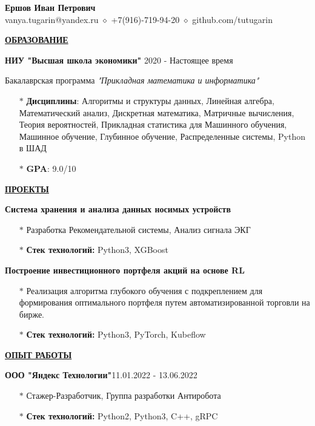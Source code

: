 \documentclass[11pt]{article}
\begin{document}
\begin{center}
\thispagestyle{empty}
\large \textbf{Ершов Иван Петрович \\}    
\normalsize vanya.tugarin@yandex.ru $\diamond$ +7(916)-719-94-20 $\diamond$ github.com/tutugarin   \\
\hrulefill
\end{center}

\noindent \textbf{\underline{ОБРАЗОВАНИЕ}} \\
\par \textbf{НИУ "Высшая школа экономики"} \hfill 2020 - Настоящее время
\par Бакалаврская программа \textit{"Прикладная математика и информатика" } 
\begin{itemize}
\item[$\ast$] \textbf{Дисциплины}: Алгоритмы и структуры данных, Линейная алгебра, Математический анализ, Дискретная математика, Матричные вычисления, Теория вероятностей, Прикладная статистика для Машинного обучения, Машинное обучение, Глубинное обучение, Распределенные системы, Python в ШАД

\item[$\ast$] \textbf{GPA}: 9.0/10 \\
\end{itemize}

\noindent \textbf{\underline{ПРОЕКТЫ}} \\
\par \textbf{\large{Система хранения и анализа данных носимых устройств}}
\begin{itemize}
\item[$\ast$] Разработка Рекомендательной системы, Анализ сигнала ЭКГ
\item[$\ast$] \textbf{Стек технологий:} Python3, XGBoost\\
\end{itemize}

\par \textbf{\large{Построение инвестиционного портфеля акций на основе RL}}
\begin{itemize}
\item[$\ast$] Реализация алгоритма глубокого обучения с подкреплением для формирования оптимального портфеля путем автоматизированной торговли на бирже.
\item[$\ast$] \textbf{Стек технологий:} Python3, PyTorch, Kubeflow \\
\end{itemize}

\noindent \textbf{\underline{ОПЫТ РАБОТЫ}} \\
\par \textbf{ООО "Яндекс Технологии"}\hfill 11.01.2022 - 13.06.2022
\begin{itemize}
    \item[$\ast$] Стажер-Разработчик, Группа разработки Антиробота
    \item[$\ast$] \textbf{Стек технологий:} Python2, Python3, C++, gRPC \\
\end{itemize}
\end{document}
